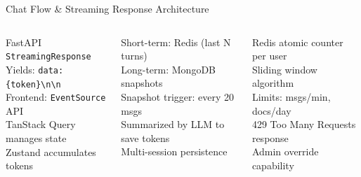 \documentclass[aspectratio=169,12pt]{beamer}
\begin{document}
\begin{frame}{Chat Flow \& Streaming Response Architecture}
\vspace{6pt}
\begin{columns}[T]
  \begin{tcolorbox}[mybox,title={SSE Streaming}]
    \tiny
    FastAPI \texttt{StreamingResponse}\\
    Yields: \texttt{data: \{token\}\textbackslash n\textbackslash n}\\
    Frontend: \texttt{EventSource} API\\
    TanStack Query manages state\\
    Zustand accumulates tokens
  \end{tcolorbox}
  \begin{tcolorbox}[mybox,title={Conversation Memory}]
    \tiny
    Short-term: Redis (last N turns)\\
    Long-term: MongoDB snapshots\\
    Snapshot trigger: every 20 msgs\\
    Summarized by LLM to save tokens\\
    Multi-session persistence
  \end{tcolorbox}
  \begin{tcolorbox}[mybox,title={Rate Limiting}]
    \tiny
    Redis atomic counter per user\\
    Sliding window algorithm\\
    Limits: msgs/min, docs/day\\
    429 Too Many Requests response\\
    Admin override capability
  \end{tcolorbox}
\end{columns}
\end{frame}
\end{document}
